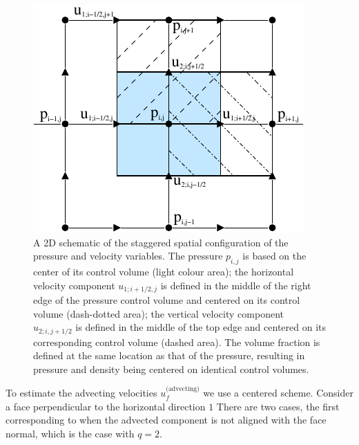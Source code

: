 \begin{figure}
\begin{center}
\includegraphics[width=\textwidth]{plots/stag-grid.pdf}
\end{center}
\caption{A 2D schematic of the staggered spatial configuration of the
pressure and velocity variables.
The pressure $p_{i,j}$ is based on the center of its control volume (light colour area);
the horizontal velocity component $u_{1;i+1/2,j}$ is defined in the middle of the
right edge of the pressure control volume and centered on its control volume
(dash-dotted area); the vertical velocity component $u_{2;i,j+1/2}$ is defined in the
middle of the top edge and centered on its corresponding control volume (dashed area).
The volume fraction is defined at the same location as that of the pressure, 
resulting in pressure and density being centered on identical control volumes.  
}
\label{stag-grid}
\end{figure}


To estimate the advecting velocities $u_f^{\textrm{(advecting)}}$ we use a centered scheme.
Consider a face perpendicular to the horizontal direction $1$
There are two cases, the first corresponding to when 
the advected component is not aligned with the 
face normal, which is the case with $q=2$. 


